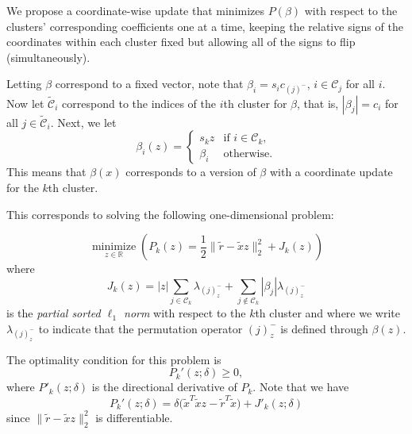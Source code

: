 We propose a coordinate-wise update that minimizes \(P(\beta)\) with respect to the
clusters' corresponding coefficients one at a time, keeping the relative signs
of the coordinates within each cluster fixed but allowing all of the signs to
flip (simultaneously).

Letting \(\beta\) correspond to a fixed vector, note that
\(\beta_i = s_i c_{(j)^-}\), \(i \in \mathcal{C}_j\) for all
\(i\). Now let \(\tilde{\mathcal{C}}_i\)
correspond to the indices of the \(i\)th cluster for \(\beta\), that is,
\(|\beta_j| = c_i\) for all \(j \in \tilde{\mathcal{C}}_i\).
Next, we let
\begin{equation}
  \label{eq:coordinate-update-beta}
  \beta_i(z) =
  \begin{cases}
    s_k z   & \text{if } i \in \mathcal{C}_k, \\
    \beta_i & \text{otherwise.}
  \end{cases}
\end{equation}
This means that \(\beta(x)\) corresponds to a version of \(\beta\) with a
coordinate update for the \(k\)th cluster.

This corresponds to solving the following
one-dimensional problem:

\begin{equation}
  \label{eq:cluster-problem}
  \operatorname*{minimize}_{z \in \mathbb{R}} \left(P_k(z) = \frac{1}{2} \lVert \tilde r - \tilde x z \rVert_2^2 + J_k(z)\right)
\end{equation}
where
\[
  J_k(z) = |z| \sum_{j \in \mathcal{C}_k} \lambda_{(j)^-_z}
  + \sum_{j \notin \mathcal{C}_k} |\beta_j| \lambda_{(j)^-_z}
\]
is the \emph{partial sorted \(\ell_1\) norm} with respect to the \(k\)th cluster and
where we write \(\lambda_{(j)^-_z}\) to indicate that the permutation operator \((j)^-_z\)
is defined through \(\beta(z)\).

The optimality condition for this problem is
\[
  P_k'(z; \delta) \geq 0,
\]
where \(P'_k(z; \delta)\) is the directional derivative of \(P_k\).
Note that we have
\[
  P_k'(z; \delta) = \delta\big(\tilde x^T \tilde x z - \tilde r^T \tilde x\big) + J'_k(z; \delta)
\]
since \(\lVert \tilde{r} - \tilde{x}z\rVert_2^2\) is differentiable.

